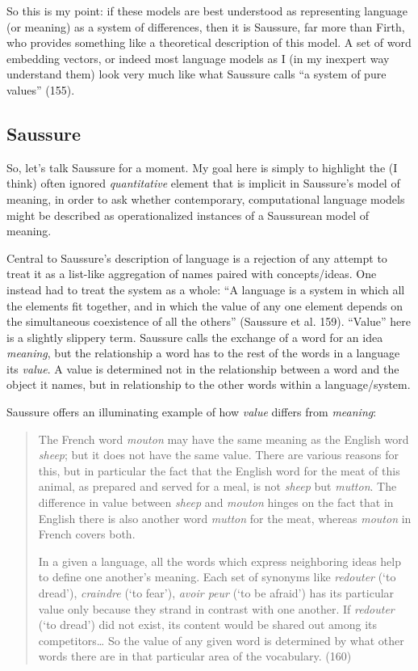 \documentclass[
  12pt,
]{article}
\begin{document}
So this is my point: if these models are best understood as representing
language (or meaning) as a system of differences, then it is Saussure,
far more than Firth, who provides something like a theoretical
description of this model. A set of word embedding vectors, or indeed
most language models as I (in my inexpert way understand them) look very
much like what Saussure calls ``a system of pure values'' (155).

\hypertarget{saussure}{%
\subsection{Saussure}\label{saussure}}

So, let's talk Saussure for a moment. My goal here is simply to
highlight the (I think) often ignored \emph{quantitative} element that
is implicit in Saussure's model of meaning, in order to ask whether
contemporary, computational language models might be described as
operationalized instances of a Saussurean model of meaning.

Central to Saussure's description of language is a rejection of any
attempt to treat it as a list-like aggregation of names paired with
concepts/ideas. One instead had to treat the system as a whole: ``A
language is a system in which all the elements fit together, and in
which the value of any one element depends on the simultaneous
coexistence of all the others'' (Saussure et al. 159). ``Value'' here is
a slightly slippery term. Saussure calls the exchange of a word for an
idea \emph{meaning}, but the relationship a word has to the rest of the
words in a language its \emph{value}. A value is determined not in the
relationship between a word and the object it names, but in relationship
to the other words within a language/system.

Saussure offers an illuminating example of how \emph{value} differs from
\emph{meaning}:

\begin{quote}
The French word \emph{mouton} may have the same meaning as the English
word \emph{sheep}; but it does not have the same value. There are
various reasons for this, but in particular the fact that the English
word for the meat of this animal, as prepared and served for a meal, is
not \emph{sheep} but \emph{mutton}. The difference in value between
\emph{sheep} and \emph{mouton} hinges on the fact that in English there
is also another word \emph{mutton} for the meat, whereas \emph{mouton}
in French covers both.

In a given a language, all the words which express neighboring ideas
help to define one another's meaning. Each set of synonyms like
\emph{redouter} (`to dread'), \emph{craindre} (`to fear'), \emph{avoir
peur} (`to be afraid') has its particular value only because they strand
in contrast with one another. If \emph{redouter} (`to dread') did not
exist, its content would be shared out among its competitors\ldots{} So
the value of any given word is determined by what other words there are
in that particular area of the vocabulary. (160)
\end{quote}
\end{document}
